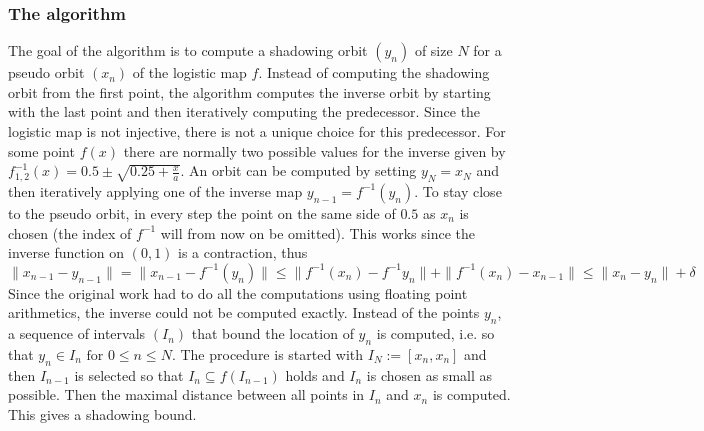     \subsubsection{The algorithm}
    The goal of the algorithm is to compute a shadowing orbit $(y_n)$ of size $N$ for a pseudo orbit $(x_n)$ of the logistic map $f$.
  Instead of computing the shadowing orbit from the first point, the algorithm computes the inverse orbit by starting with the last point and then iteratively computing the predecessor. 
  Since the logistic map is not injective, there is not a unique choice for this predecessor. 
  For some point $f(x)$ there are normally two possible values for the inverse given by $f^{-1}_{1,2}(x) = 0.5 \pm \sqrt{0.25 + \frac{x}{a}} $.
  An orbit can be computed by setting $y_N = x_N$ and then iteratively applying one of the inverse map $y_{n-1} = f^{-1}(y_n)$.   To stay close to the pseudo orbit, in every step the point on the same side of $0.5$ as $x_n$ is chosen (the index of $f^{-1}$ will from now on be omitted). 
  This works since the inverse function on $(0,1)$ is a contraction, thus
  $$ \| x_{n-1} - y_{n-1} \| = \| x_{n-1} - f^{-1}(y_n) \| \leq \| f^{-1}(x_n) - f^{-1}{y_n} \| + \| f^{-1}(x_n) - x_{n-1} \| \leq \| x_n - y_n \| + \delta $$   
  Since the original work had to do all the computations using floating point arithmetics, the inverse could not be computed exactly.
  Instead of the points $y_n$, a sequence of intervals $(I_n)$ that bound the location of $y_n$ is computed, i.e. so that $y_n \in I_n \text{ for } 0 \leq n \leq N$.
  The procedure is started with $I_N := [x_n, x_n]$ and then $I_{n-1}$ is selected so that $I_n \subseteq f(I_{n-1})$ holds and $I_n$ is chosen as small as possible. 
  Then the maximal distance between all points in $I_n$ and $x_n$ is computed.
  This gives a shadowing bound.
